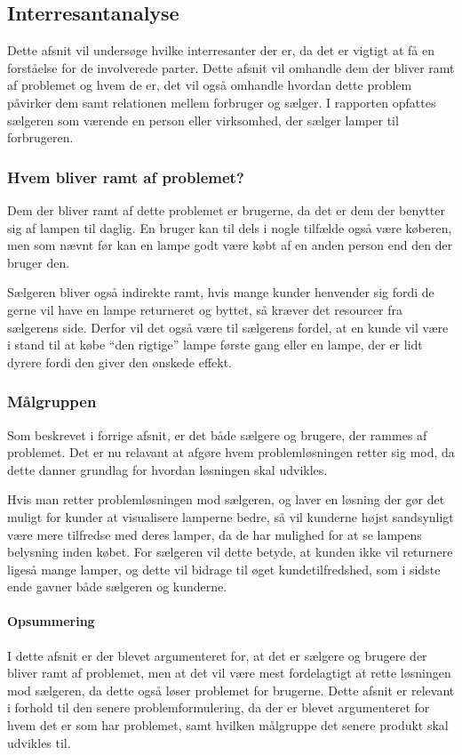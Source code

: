 \subsection{Interresantanalyse}

 Dette afsnit vil undersøge hvilke interresanter der er, da det er vigtigt at få en forståelse for de involverede parter. Dette afsnit vil omhandle dem der bliver ramt af problemet og hvem de er, det vil også omhandle hvordan dette problem påvirker dem samt relationen mellem forbruger og sælger. I rapporten opfattes sælgeren som værende en person eller virksomhed, der sælger lamper til forbrugeren. 

\subsubsection{Hvem bliver ramt af problemet?}
Dem der bliver ramt af dette problemet er brugerne, da det er dem der benytter sig af lampen til daglig. En bruger kan til dels i nogle tilfælde også være køberen, men som nævnt før kan en lampe godt være købt af en anden person end den der bruger den.

Sælgeren bliver også indirekte ramt, hvis mange kunder henvender sig fordi de gerne vil have en lampe returneret og byttet, så kræver det resourcer fra sælgerens side. Derfor vil det også være til sælgerens fordel, at en kunde vil være i stand til at købe “den rigtige” lampe første gang eller en lampe, der er lidt dyrere fordi den giver den ønskede effekt.
 
\subsubsection{Målgruppen}
Som beskrevet i forrige afsnit, er det både sælgere og brugere, der rammes af problemet. Det er nu relavant at afgøre hvem problemløsningen retter sig mod, da dette danner grundlag for hvordan løsningen skal udvikles. 

Hvis man retter problemløsningen mod sælgeren, og laver en løsning der gør det muligt for kunder at visualisere lamperne bedre, så vil kunderne højst sandsynligt være mere tilfredse med deres lamper, da de har mulighed for at se lampens belysning inden købet. For sælgeren vil dette betyde, at kunden ikke vil returnere ligeså mange lamper, og dette vil bidrage til øget kundetilfredshed, som i sidste ende gavner både sælgeren og kunderne.

\paragraph{Opsummering}
I dette afsnit er der blevet argumenteret for, at det er sælgere og brugere der bliver ramt af problemet, men at det vil være mest fordelagtigt at rette løsningen mod sælgeren, da dette også løser problemet for brugerne. \newline Dette afsnit er relevant i forhold til den senere problemformulering, da der er blevet argumenteret for hvem det er som har problemet, samt hvilken målgruppe det senere produkt skal udvikles til.
